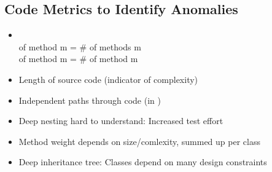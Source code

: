 \subsection{Code Metrics to Identify Anomalies}
\begin{defBox}[title=Some software metrics]
    \begin{itemize}
        \item {} \\
         of method m = \# of methods  m\\
         of method m = \# of method  m
        \item {} Length of source code (indicator of complexity)
        \item {} Independent paths through code (in )
        \item {} Deep nesting hard to understand: Increased test effort
        \item {} Method weight depends on size/comlexity, summed up per class
        \item {} Deep inheritance tree: Classes depend on many design constraints
    \end{itemize}
\end{defBox}
